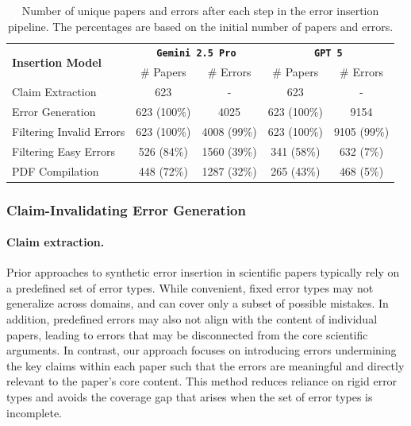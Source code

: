 \documentclass{article}
\newcommand{\gemini}{\texttt{Gemini 2.5 Pro}}
\newcommand{\gpt}{\texttt{GPT 5}}
\begin{document}
\begin{table}[h]
    \centering
    \begin{tabular}{lcccc}
    \hline
    
    \multirow{2}{*}{\textbf{Insertion Model}} & \multicolumn{2}{c}{\textbf{\gemini{}}}& \multicolumn{2}{c}{\textbf{\gpt{}}} \\
     
     
    & \# Papers & \# Errors & \# Papers & \# Errors\\
    \hline
     
    Claim Extraction & 623 & - & 623& - \\
    Error Generation & 623 (100\%) & 4025 & 623 (100\%)& 9154 \\
    \hline
    Filtering Invalid Errors & 623 (100\%) & 4008 (99\%) & 623 (100\%)&  9105 (99\%)\\
    Filtering Easy Errors & 526 (84\%)& 1560 (39\%) & 341 (58\%) & 632 (7\%)\\
    \hline
    PDF Compilation & 448 (72\%)& 1287 (32\%) & 265 (43\%)& 468 (5\%)\\
    \hline
    \end{tabular}
    \caption{Number of unique papers and errors after each step in the error insertion pipeline. The percentages are based on the initial number of papers and errors. }
    \label{table:filtering_papers}
    
\end{table}

\subsubsection{Claim-Invalidating Error Generation}
\paragraph{Claim extraction.} Prior approaches to synthetic error insertion in scientific papers typically rely on a predefined set of error types. While convenient, fixed error types may not generalize across domains, and can cover only a subset of possible mistakes. In addition, predefined errors may also not align with the content of individual papers, leading to errors that may be disconnected from the core scientific arguments. In contrast, our approach focuses on introducing errors undermining the key claims within each paper such that the errors are meaningful and directly relevant to the paper's core content. This method reduces reliance on rigid error types and avoids the coverage gap that arises when the set of error types is incomplete.
\end{document}
